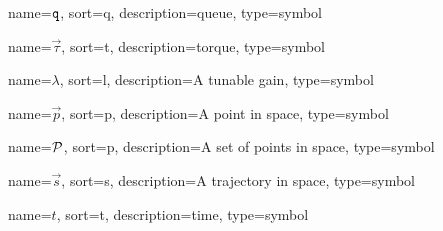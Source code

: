 	{%
		name=\ensuremath{\code{q}},
		sort=q,
		description=queue,
		type=symbol
	}
	\newcommand{\queue}{\gls{sym:queue}}

	{%
		name=\ensuremath{\vec{\tau}},
		sort=t,
		description=torque,
		type=symbol
	}
	\newcommand{\torque}{\gls{sym:torque}}

	{%
		name={\ensuremath{\lambda}},
		sort=l,
		description=A tunable gain,
		type=symbol
	}
	\newcommand{\gain}{\gls{sym:gain}}

	{%
		name={\ensuremath{\vec{p}}},
		sort=p,
		description=A point in space,
		type=symbol
	}
	\newcommand{\point}{\gls{sym:point}}

	{%
		name={\ensuremath{\set{P}}},
		sort=p,
		description=A set of points in space,
		type=symbol
	}
	\newcommand{\setofpoints}{\gls{sym:setofpoints}}

	{%
		name={\ensuremath{\vec{s}}},
		sort=s,
		description=A trajectory in space,
		type=symbol
	}
	\newcommand{\traj}{\gls{sym:traj}}

	\newcommand{\pathsym}{\traj}


	{%
		name={\ensuremath{t}},
		sort=t,
		description=time,
		type=symbol
	}
	\newcommand{\timesym}{\gls{sym:time}}

